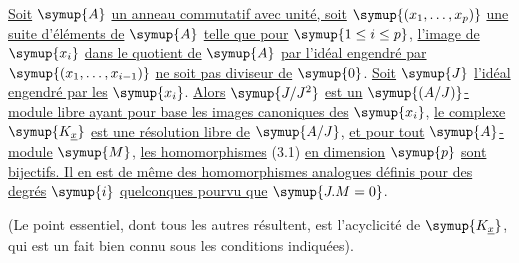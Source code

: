  \uline{Soit} $\symup{A}$ \uline{un anneau commutatif avec unité, soit}
$\symup{(x_1,\ldots,x_p)}$ \uline{une suite d'éléments de} $\symup{A}$ \uline{telle que pour} $\symup{1\leq i\leq p}$,
\uline{l'image de} $\symup{x_i}$ \uline{dans le quotient de} $\symup{A}$ \uline{par l'idéal engendré par}
$\symup{(x_1,\ldots,x_{i-1})}$ \uline{ne soit pas diviseur de} $\symup{0}$. \uline{Soit} $\symup{J}$ \uline{l'idéal engendré
par les} $\symup{x_i}$. \uline{Alors} $\symup{J/J^{2}}$ \uline{est un} $\symup{(A/J)}$\uline{-module libre ayant pour base les
images canoniques des} $\symup{x_i}$, \uline{le complexe} $\symup{K_{\underline{x}}}$ \uline{est une résolution
libre de} $\symup{A/J}$, \uline{et pour tout} $\symup{A}$\uline{-module} $\symup{M}$, \uline{les homomorphismes} (3.1) \uline{en
dimension} $\symup{p}$ \uline{sont bijectifs. Il en est de même des homomorphismes analogues
définis pour des degrés} $\symup{i}$ \uline{quelconques pourvu que} $\symup{J.M=0}$.

(Le point essentiel, dont tous les autres résultent, est l'acyclicité de
$\symup{K_{\underline{x}}}$, qui est un fait bien connu sous les conditions indiquées).

